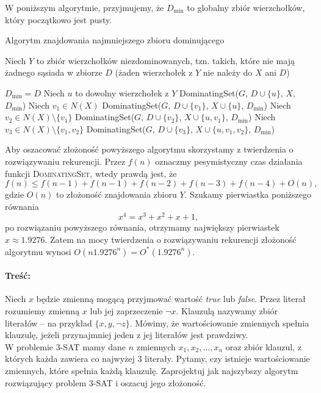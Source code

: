 W poniższym algorytmie, przyjmujemy, że $D_{\min}$ to globalny zbiór
wierzchołków, który początkowo jest pusty.
\begin{algorithm}[H]
	\caption{Algorytm znajdowania najmniejszego zbioru dominującego}
	\begin{algorithmic}[1]
		\State \Return
		\EndIf
		\State Niech $Y$ to zbiór wierzchołków niezdominowanych, tzn. takich, które nie mają żadnego sąsiada w zbiorze $D$ (żaden
		wierzchołek z $Y$ nie należy do $X$ ani $D$)		

		\State $D_{\min} = D$
		\EndIf
		\State \Return
		\EndIf
		\State Niech $u$ to dowolny wierzchołek z $Y$
		\State DominatingSet($G$, $D \cup \{u\}$, $X$, $D_{\min}$)
		\State Niech $v_1 \in N(X)$
		\State DominatingSet($G$, $D \cup \{v_1\}$, $X \cup \{u\}$, $D_{\min}$)
		\EndIf
		\EndIf
		\State Niech $v_2 \in N(X) \setminus \{v_1\}$
		\State DominatingSet($G$, $D \cup \{v_2\}$, $X \cup \{u, v_1\}$, $D_{\min}$)
		\EndIf
		\EndIf
		\State Niech $v_3 \in N(X) \setminus \{v_1, v_2\}$
		\State DominatingSet($G$, $D \cup \{v_3\}$, $X \cup \{u, v_1, v_2\}$, $D_{\min}$)
		\EndIf
		\EndIf
		\EndProcedure		
	\end{algorithmic}
\end{algorithm}

Aby oszacować złożoność powyższego algorytmu skorzystamy z 
twierdzenia o rozwiązywaniu rekurencji. Przez $f(n)$
oznaczmy pesymistyczny czas działania funkcji \textsc{DominatingSet},
wtedy prawdą jest, że
\[f(n) \leq f(n-1) + f(n-1) + f(n-2) + f(n-3) + f(n-4) + O(n),\]
gdzie $O(n)$ to złożoność znajdowania zbioru $Y$. 
Szukamy pierwiastka poniższego równania
\[x^4 = x^3 + x^2 + x + 1,\]
po rozwiązaniu powyższego równania, otrzymamy największy
pierwiastek $x \approx 1.9276$. Zatem na mocy twierdzenia
o rozwiązywaniu rekurencji złożoność algorytmu wynosi $O(n1.9276^n) = O^*(1.9276^n)$.

\paragraph{Treść: } Niech $x$ będzie zmienną mogącą przyjmować wartość \textit{true} lub \textit{false}. Przez literał rozumiemy zmienną
$x$ lub jej zaprzeczenie $\lnot x$. Klauzulą nazywamy zbiór literałów -- na przykład $\{x, y, \lnot z\}$. Mówimy, że wartościowanie
zmiennych spełnia klauzulę, jeżeli przynajmniej jeden z jej literałów jest prawdziwy.
\\ W problemie 3-SAT mamy dane $n$ zmiennych $x_1, x_2, \ldots, x_n$ oraz zbiór klauzul, z których każda zawiera co najwyżej
3 literały. Pytamy, czy istnieje wartościowanie zmiennych, które spełnia każdą klauzulę.
Zaprojektuj jak najszybszy algorytm rozwiązujący problem 3-SAT i oszacuj jego złożoność.

